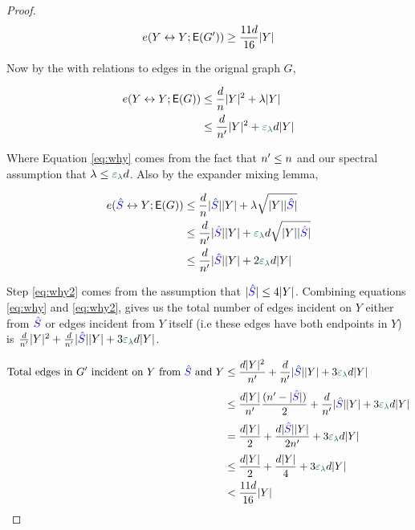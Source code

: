\documentclass[11pt]{article}
\begin{document}
\begin{proof}
\begin{equation}\label{eq:edge-lower-bound}
  e(Y \leftrightarrow Y; \mathsf{E}(G')) \geq \frac{11d}{16}|Y|
\end{equation}

Now by the  with relations to edges in the orignal graph $G$,

\begin{align}
  \CutEdges{Y}{Y}{\Edges{G}}  &\leq \frac{d}{n}\Size{Y}^2 + \lambda\Size{Y} \\
  &\leq \frac{d}{\SizeRemGraph}\Size{Y}^2 + \epsilonL d \Size{Y} \label{eq:why}
\end{align}

Where Equation \eqref{eq:why} comes from the fact that $n' \leq n$ and our spectral assumption that $\lambda \leq \epsilonL d$.
Also by the expander mixing lemma,

\begin{align}
  \CutEdges{\BadSet}{Y}{\Edges{G}}  &\leq \frac{d}{n}\Size{\BadSet}\Size{Y} + \lambda\sqrt{\Size{Y}\Size{\BadSet}} \\
                                    &\leq \frac{d}{\SizeRemGraph}\Size{\BadSet}\Size{Y} + \epsilonL d\sqrt{\Size{Y}\Size{\BadSet}} \\
  &\leq \frac{d}{\SizeRemGraph}\Size{\BadSet}\Size{Y} + 2\epsilonL d\Size{Y} \label{eq:why2}
\end{align}

Step \eqref{eq:why2} comes from the assumption that $|\textcolor{blue}{\hat{S}}| \leq 4|Y|$. Combining equations \eqref{eq:why} and \eqref{eq:why2}, gives us the total number of edges incident on $Y$ either from $\textcolor{blue}{\hat{S}}$ or edges incident from $Y$ itself (i.e these edges have both endpoints in $Y$) is $\frac{d}{\SizeRemGraph}\Size{Y}^2 +   \frac{d}{\SizeRemGraph}\Size{\BadSet}\Size{Y} + 3\epsilonL d\Size{Y}$.

\begin{align}
 \text{Total edges in $\RemGraph$ incident on $Y$ from $\BadSet$ and $Y$} &\leq \frac{d\Size{Y}^2}{\SizeRemGraph} +   \frac{d}{\SizeRemGraph}\Size{\BadSet}\Size{Y} + 3\epsilonL d\Size{Y}\\[3pt]                                                                          &\leq  \frac{d\Size{Y}}{\SizeRemGraph}\frac{(\SizeRemGraph - \Size{\BadSet})}{2} + \frac{d}{\SizeRemGraph}\Size{\BadSet}\Size{Y} + 3\epsilonL d\Size{Y} \label{eq:why3}\\[3pt]
                                                                          &= \frac{d\Size{Y}}{2} + \frac{d\Size{\BadSet}\Size{Y}}{2\SizeRemGraph} +3\epsilonL d\Size{Y}\\[3pt]
                                                                          &\leq \frac{d\Size{Y}}{2} + \frac{d\Size{Y}}{4} +3\epsilonL d\Size{Y}  \label{eq:why4}\\
                                                                            &< \frac{11d}{16}\Size{Y} \label{eq:edge-upperbound}
\end{align}


\end{proof}
\end{document}
